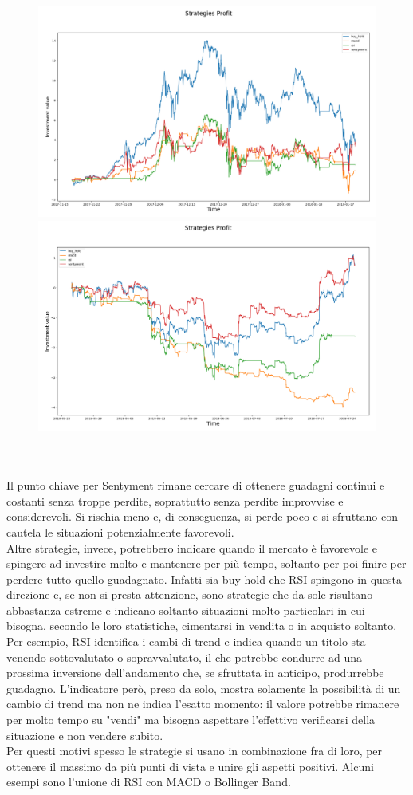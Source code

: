 \documentclass[a4paper,12pt]{report}
\begin{document}
\begin{fig}
\begin{fig}
	\begin{subfigure}{\linewidth}
		\includegraphics[width=.5\linewidth]{final_example_2017}
		\includegraphics[width=.5\linewidth]{final_example_2018}
	\end{subfigure}
	\label{Figura 26}
\end{fig}
\\~\\ Il punto chiave per Sentyment rimane cercare di ottenere guadagni continui e costanti senza troppe perdite, soprattutto senza perdite improvvise e considerevoli. Si rischia meno e, di conseguenza, si perde poco e si sfruttano con cautela le situazioni potenzialmente favorevoli.\\ Altre strategie, invece, potrebbero indicare quando il mercato è favorevole e spingere ad investire molto e mantenere per più tempo, soltanto per poi finire per perdere tutto quello guadagnato. Infatti sia buy-hold che RSI spingono in questa direzione e, se non si presta attenzione, sono strategie che da sole risultano abbastanza estreme e indicano soltanto situazioni molto particolari in cui bisogna, secondo le loro statistiche, cimentarsi in vendita o in acquisto soltanto. Per esempio, RSI identifica i cambi di trend e indica quando un titolo sta venendo sottovalutato o sopravvalutato, il che potrebbe condurre ad una prossima inversione dell'andamento che, se sfruttata in anticipo, produrrebbe guadagno. L'indicatore però, preso da solo, mostra solamente la possibilità di un cambio di trend ma non ne indica l'esatto momento: il valore potrebbe rimanere per molto tempo su "vendi" ma bisogna aspettare l'effettivo verificarsi della situazione e non vendere subito.\\ Per questi motivi spesso le strategie si usano in combinazione fra di loro, per ottenere il massimo da più punti di vista e unire gli aspetti positivi. Alcuni esempi sono l'unione di RSI con MACD o Bollinger Band.

\end{fig}
\end{document}
